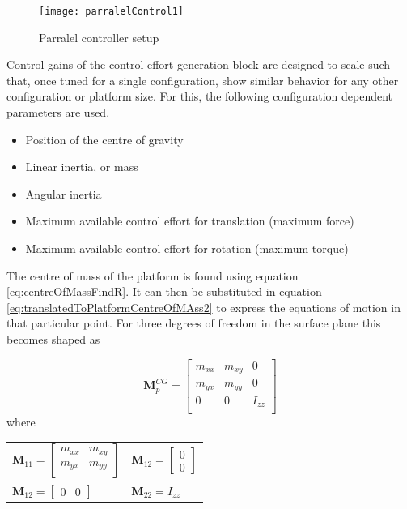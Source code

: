 \begin{figure}[H]
	\centering
	\captionsetup{justification=centering}
	\texttt{[image: parralelControl1]}
	\caption{Parralel controller setup}
	\label{fig:parralelControl1}
\end{figure}

Control gains of the control-effort-generation block are designed to scale such that, once tuned for a single configuration, show similar behavior for any other configuration or platform size. For this, the following configuration dependent parameters are used. \\

\begin{itemize}
	\item Position of the centre of gravity
	\item Linear inertia, or mass
	\item Angular inertia
	\item Maximum available control effort for translation (maximum force)
	\item Maximum available control effort for rotation (maximum torque)
\end{itemize}

The centre of mass of the platform is found using equation \ref{eq:centreOfMassFindR}. It can then be substituted in equation \ref{eq:translatedToPlatformCentreOfMAss2} to express the equations of motion in that particular point. For three degrees of freedom in the surface plane this becomes shaped as

\begin{equation}
	\textbf{M}_{p}^{CG} = \begin{bmatrix}
	m_{xx} 	&	m_{xy}	& 0 		\\[10pt]
	m_{yx} 	&	m_{yy}	& 0 		\\[10pt]
	0 		&	0		& I_{zz} 	\\[10pt]
	\end{bmatrix}
\end{equation}
where

\begin{table}[H]
	\centering
	\begin{tabular}{ll}
		
		$	\textbf{M}_{11} = \begin{bmatrix}
		m_{xx} 	&	m_{xy}	\\[10pt]
		m_{yx} 	&	m_{yy}	\\[10pt] \end{bmatrix}$ & 
		
		$	\textbf{M}_{12} = \begin{bmatrix}	 0 	\\[10pt]  0	\end{bmatrix}$ \\[25pt]
		
		$	\textbf{M}_{12} = \begin{bmatrix}		0 	& 0 \end{bmatrix}$ &
		
		$	\textbf{M}_{22} =  I_{zz} $
	\end{tabular}
\end{table}



